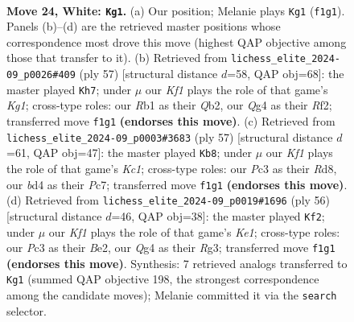 \documentclass[11pt]{article}
\begin{document}
\clearpage

\begin{figure}[p]\centering
\begin{subfigure}{0.46\textwidth}\centering
\resizebox{\linewidth}{!}{%
\newchessgame
\chessboard[
  setfen={r7/2p2kpp/3p4/1q6/pP1b2Q1/2P5/P4PPP/1RB2K2 w - - 1 24},
  showmover=false,
  pgfstyle=straightmove, color=movearrow, markmove={f1-g1}
]}
\caption{}
\end{subfigure}\hfill
\begin{subfigure}{0.46\textwidth}\centering
\resizebox{\linewidth}{!}{%
\newchessgame
\chessboard[
  setfen={1Q4k1/5p2/1p2ppbp/8/3P3P/4PB2/1q3rP1/3R2K1 b - - 1 29},
  showmover=false,
  pgfstyle=straightmove, color=movearrow, markmove={g8-h7}
]}
\caption{}
\end{subfigure}
\\[4pt]
\begin{subfigure}{0.46\textwidth}\centering
\resizebox{\linewidth}{!}{%
\newchessgame
\chessboard[
  setfen={2kr4/1pp5/p3Q2p/6p1/2P5/PP2p1P1/4q2P/5RK1 b - - 0 29},
  showmover=false,
  pgfstyle=straightmove, color=movearrow, markmove={c8-b8}
]}
\caption{}
\end{subfigure}\hfill
\begin{subfigure}{0.46\textwidth}\centering
\resizebox{\linewidth}{!}{%
\newchessgame
\chessboard[
  setfen={3r2k1/6pp/2p5/Q2p4/3P2b1/P5R1/1P2B1PP/2q1K3 w - - 5 29},
  showmover=false,
  pgfstyle=straightmove, color=movearrow, markmove={e1-f2}
]}
\caption{}
\end{subfigure}
\caption{\textbf{Move 24, White: \texttt{Kg1}.} (a) Our position; Melanie plays \texttt{Kg1} (\texttt{f1g1}). Panels (b)--(d) are the retrieved master positions whose correspondence most drove this move (highest QAP objective among those that transfer to it). (b) Retrieved from \texttt{lichess\_elite\_2024-09\_p0026\#409} (ply 57) [structural distance $d$=58, QAP obj=68]: the master played \texttt{Kh7}; under $\mu$ our \emph{Kf1} plays the role of that game's \emph{Kg1}; cross-type roles: our \emph{R}b1 as their \emph{Q}b2, our \emph{Q}g4 as their \emph{R}f2; transferred move \texttt{f1g1} \textbf{(endorses this move)}. (c) Retrieved from \texttt{lichess\_elite\_2024-09\_p0003\#3683} (ply 57) [structural distance $d$=61, QAP obj=47]: the master played \texttt{Kb8}; under $\mu$ our \emph{Kf1} plays the role of that game's \emph{Kc1}; cross-type roles: our \emph{P}c3 as their \emph{R}d8, our \emph{b}d4 as their \emph{P}c7; transferred move \texttt{f1g1} \textbf{(endorses this move)}. (d) Retrieved from \texttt{lichess\_elite\_2024-09\_p0019\#1696} (ply 56) [structural distance $d$=46, QAP obj=38]: the master played \texttt{Kf2}; under $\mu$ our \emph{Kf1} plays the role of that game's \emph{Ke1}; cross-type roles: our \emph{P}c3 as their \emph{B}e2, our \emph{Q}g4 as their \emph{R}g3; transferred move \texttt{f1g1} \textbf{(endorses this move)}. Synthesis: 7 retrieved analogs transferred to \texttt{Kg1} (summed QAP objective 198, the strongest correspondence among the candidate moves); Melanie committed it via the \texttt{search} selector.}
\label{fig:thought-m46}
\end{figure}
\end{document}
